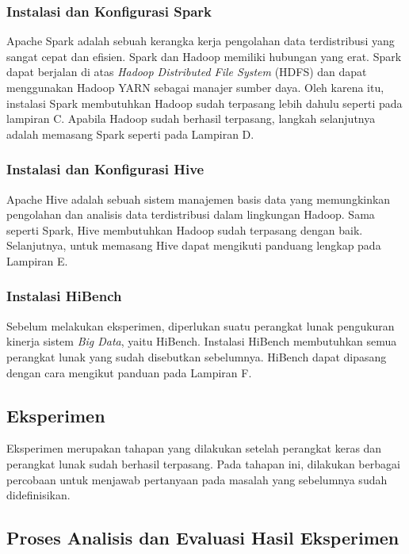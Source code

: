 \subsubsection{Instalasi dan Konfigurasi Spark}
Apache Spark adalah sebuah kerangka kerja pengolahan data terdistribusi yang sangat cepat dan efisien. Spark dan Hadoop memiliki hubungan yang erat. Spark dapat berjalan di atas \textit{Hadoop Distributed File System} (HDFS) dan dapat menggunakan Hadoop YARN sebagai manajer sumber daya. Oleh karena itu, instalasi Spark membutuhkan Hadoop sudah terpasang lebih dahulu seperti pada lampiran C. Apabila Hadoop sudah berhasil terpasang, langkah selanjutnya adalah memasang Spark seperti pada Lampiran D.

\subsubsection{Instalasi dan Konfigurasi Hive}
Apache Hive adalah sebuah sistem manajemen basis data yang memungkinkan pengolahan dan analisis data terdistribusi dalam lingkungan Hadoop. Sama seperti Spark, Hive membutuhkan Hadoop sudah terpasang dengan baik. Selanjutnya, untuk memasang Hive dapat mengikuti panduang lengkap pada Lampiran E. 

\subsubsection{Instalasi HiBench}
Sebelum melakukan eksperimen, diperlukan suatu perangkat lunak pengukuran kinerja sistem \textit{Big Data}, yaitu HiBench. Instalasi HiBench membutuhkan semua perangkat lunak yang sudah disebutkan sebelumnya. HiBench dapat dipasang dengan cara mengikut panduan pada Lampiran F.

\subsection{Eksperimen}
Eksperimen merupakan tahapan yang dilakukan setelah perangkat keras dan perangkat lunak sudah berhasil terpasang. Pada tahapan ini, dilakukan berbagai percobaan untuk menjawab pertanyaan pada masalah yang sebelumnya sudah didefinisikan. 


\subsection{Proses Analisis dan Evaluasi Hasil Eksperimen}















